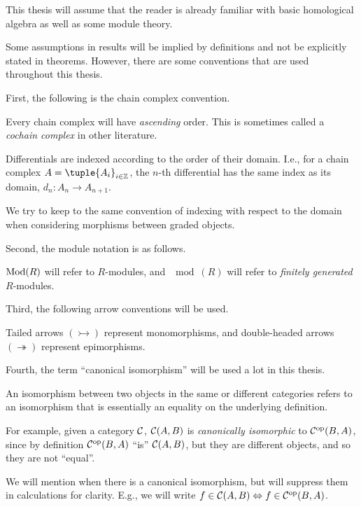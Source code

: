 This thesis will assume that the reader is already familiar with basic homological algebra as well as some module theory.

Some assumptions in results will be implied by definitions and not be explicitly stated in theorems. However, there are some conventions that are used throughout this thesis.

First, the following is the chain complex convention.
\begin{notation}
    \label{not:chain_complex}
    Every chain complex will have \emph{ascending} order. This is sometimes called a \emph{cochain complex} in other literature.

    Differentials are indexed according to the order of their domain. I.e., for a chain complex \( A = \tuple{A_i}_{i \in \Zb} \), the \( n \)-th differential has the same index as its domain, \( d_n: A_n \to A_{n + 1} \).
    
    We try to keep to the same convention of indexing with respect to the domain when considering morphisms between graded objects.
\end{notation}

Second, the module notation is as follows.
\begin{notation}
    \( \operatorname{Mod}(R) \) will refer to \( R \)-modules, and \( \mod(R) \) will refer to \emph{finitely generated} \( R \)-modules.
\end{notation}

Third, the following arrow conventions will be used.
\begin{notation}
    Tailed arrows \( (\rightarrowtail) \) represent monomorphisms, and double-headed arrows \( (\twoheadrightarrow) \) represent epimorphisms.
\end{notation}

Fourth, the term ``canonical isomorphism'' will be used a lot in this thesis.
\begin{notation}
    An isomorphism between two objects in the same or different categories refers to an isomorphism that is essentially an equality on the underlying definition.

    For example, given a category \( {\mathcal{C}} \), \( {\mathcal{C}}(A, B) \) is \emph{canonically isomorphic} to \( {\mathcal{C}}^{\operatorname{op}}(B, A) \), since by definition \( {\mathcal{C}}^{\operatorname{op}}(B, A) \) ``is'' \( {\mathcal{C}}(A, B) \), but they are different objects, and so they are not ``equal''.

    We will mention when there is a canonical isomorphism, but will suppress them in calculations for clarity. E.g., we will write \( f \in {\mathcal{C}}(A, B) \Leftrightarrow f \in {\mathcal{C}}^{\operatorname{op}}(B, A) \).
\end{notation}

